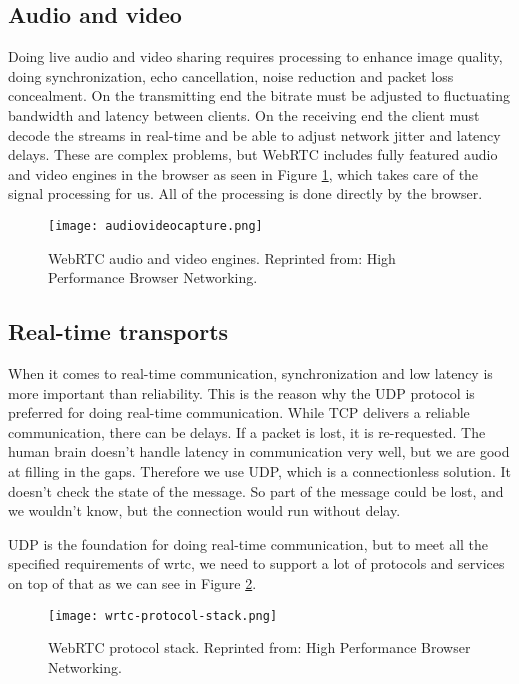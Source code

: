 \subsection{Audio and video}
Doing live audio and video sharing requires processing to enhance image quality, doing synchronization, echo cancellation, noise reduction and packet loss concealment\cite{grigorik_high_2013}. On the transmitting end the bitrate must be adjusted to fluctuating bandwidth and latency between clients. On the receiving end the client must decode the streams in real-time and be able to adjust network jitter and latency delays. These are complex problems, but WebRTC includes fully featured audio and video engines in the browser as seen in Figure \ref{fig:audiovideocapture}, which takes care of the signal processing for us. All of the processing is done directly by the browser.

\begin{figure}[here]
\centerline{\texttt{[image: audiovideocapture.png]}}
\caption{WebRTC audio and video engines. Reprinted from: High Performance Browser Networking\cite{grigorik_high_2013}.}
\label{fig:audiovideocapture}
\end{figure}

\subsection{Real-time transports}
When it comes to real-time communication, synchronization and low latency is more important than reliability. This is the reason why the UDP protocol is preferred for doing real-time communication. While TCP delivers a reliable communication, there can be delays. If a packet is lost, it is re-requested. The human brain doesn't handle latency in communication very well, but we are good at filling in the gaps. Therefore we use UDP, which is a connectionless solution. It doesn't check the state of the message. So part of the message could be lost, and we wouldn't know, but the connection would run without delay.

UDP is the foundation for doing real-time communication, but to meet all the specified requirements of \gls{wrtc}, we need to support a lot of protocols and services on top of that as we can see in Figure \ref{fig:wrtc-protocol-stack}.

\begin{figure}[here]
\centerline{\texttt{[image: wrtc-protocol-stack.png]}}
\caption{WebRTC protocol stack. Reprinted from: High Performance Browser Networking\cite{grigorik_high_2013}.}
\label{fig:wrtc-protocol-stack}
\end{figure}

